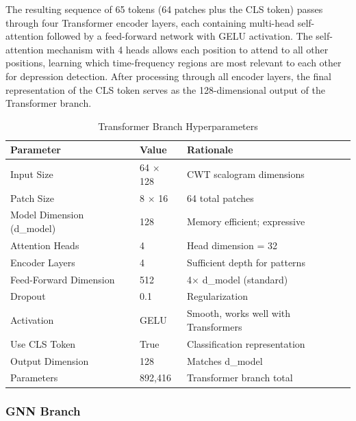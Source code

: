 The resulting sequence of 65 tokens (64 patches plus the CLS token) passes through four Transformer encoder layers, each containing multi-head self-attention followed by a feed-forward network with GELU activation. The self-attention mechanism with 4 heads allows each position to attend to all other positions, learning which time-frequency regions are most relevant to each other for depression detection. After processing through all encoder layers, the final representation of the CLS token serves as the 128-dimensional output of the Transformer branch.

\begin{table}[H]
    \centering
    \small
    \caption{Transformer Branch Hyperparameters}
    \label{tab:transformer_params}
    \begin{tabularx}{\textwidth}{|L{4cm}|L{2.5cm}|X|}
        \hline
        \textbf{Parameter} & \textbf{Value} & \textbf{Rationale} \\
        \hline
        Input Size & 64 $\times$ 128 & CWT scalogram dimensions \\
        \hline
        Patch Size & 8 $\times$ 16 & 64 total patches \\
        \hline
        Model Dimension (d\_model) & 128 & Memory efficient; expressive \\
        \hline
        Attention Heads & 4 & Head dimension = 32 \\
        \hline
        Encoder Layers & 4 & Sufficient depth for patterns \\
        \hline
        Feed-Forward Dimension & 512 & 4$\times$ d\_model (standard) \\
        \hline
        Dropout & 0.1 & Regularization \\
        \hline
        Activation & GELU & Smooth, works well with Transformers \\
        \hline
        Use CLS Token & True & Classification representation \\
        \hline
        Output Dimension & 128 & Matches d\_model \\
        \hline
        Parameters & 892,416 & Transformer branch total \\
        \hline
    \end{tabularx}
\end{table}

\subsubsection{GNN Branch}

